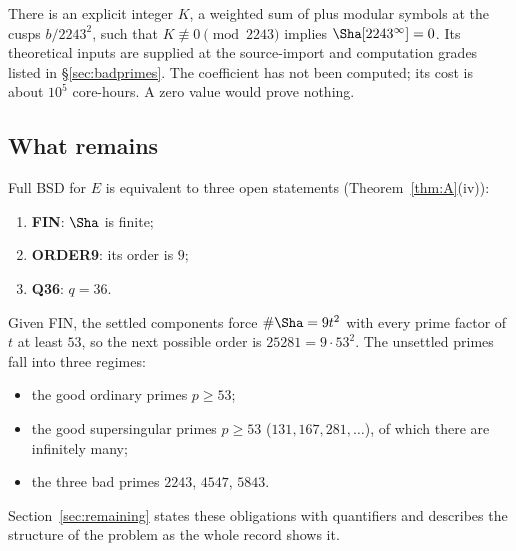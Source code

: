 \begin{theorem}\label{thm:D}
There is an explicit integer $K$, a weighted sum of plus modular symbols at the cusps $b/2243^2$, such that $K\not\equiv0\pmod{2243}$ implies $\Sha[2243^\infty]=0$. Its theoretical inputs are supplied at the source-import and computation grades listed in \S\ref{sec:badprimes}. The coefficient has not been computed; its cost is about $10^5$ core-hours. A zero value would prove nothing.
\end{theorem}

\subsection{What remains}
Full BSD for $E$ is equivalent to three open statements (Theorem~\ref{thm:A}(iv)):
\begin{enumerate}[label=(\alph*)]
\item \textbf{FIN}: $\Sha$ is finite;
\item \textbf{ORDER9}: its order is $9$;
\item \textbf{Q36}: $q=36$.
\end{enumerate}
Given FIN, the settled components force $\#\Sha=9t^2$ with every prime factor of $t$ at least $53$, so the next possible order is $25281=9\cdot53^2$. The unsettled primes fall into three regimes:
\begin{itemize}[leftmargin=*]
\item the good ordinary primes $p\ge53$;
\item the good supersingular primes $p\ge53$ ($131,167,281,\dots$), of which there are infinitely many;
\item the three bad primes $2243$, $4547$, $5843$.
\end{itemize}
Section~\ref{sec:remaining} states these obligations with quantifiers and describes the structure of the problem as the whole record shows it.

